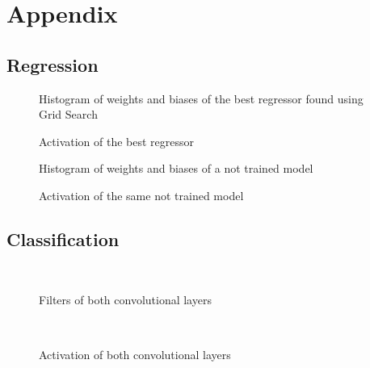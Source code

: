 \documentclass[11pt,a4paper,twocolumn]{IEEEtran}
\begin{document}
	\printbibliography
	
	\onecolumn
	\section{\textbf{Appendix}}
		\subsection{Regression}
			\begin{figure}[h]
				\centering
				
				\caption{Histogram of weights and biases of the best regressor found using Grid Search}
			\end{figure}
			\begin{figure}[h]
				\centering
				
				\caption{Activation of the best regressor}
			\end{figure}
			\newpage
			\begin{figure}[h]
				\centering
				
				\caption{Histogram of weights and biases of a not trained model}
			\end{figure}
			\begin{figure}[h]
				\centering
				
				\caption{Activation of the same not trained model}
			\end{figure}
		\newpage\subsection{Classification}
			\begin{figure}[h]
				\centering
				\\
				
				\caption{Filters of both convolutional layers}
			\end{figure}
			\begin{figure}[h]
				\centering
				\\
				
				\caption{Activation of both convolutional layers}
			\end{figure}
\end{document}
